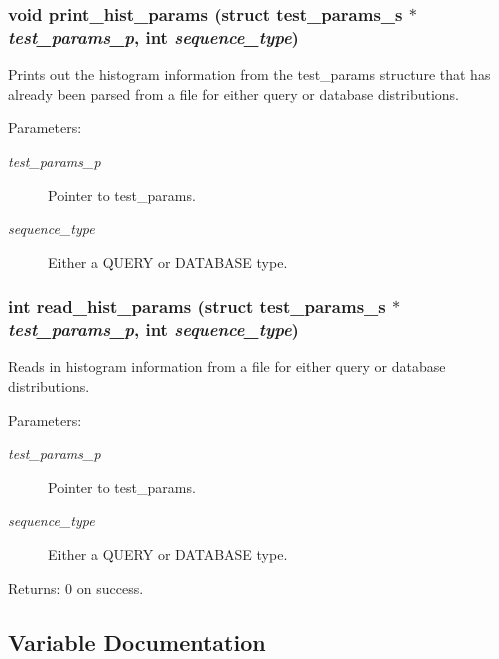 \subsubsection{\setlength{\rightskip}{0pt plus 5cm}void print\_\-hist\_\-params (struct \bf{test\_\-params\_\-s} $\ast$ {\em test\_\-params\_\-p}, int {\em sequence\_\-type})}\label{hist__params_8c_13fbbe5d74468cabdd99bf1a14929f8a}


Prints out the histogram information from the test\_\-params structure that has already been parsed from a file for either query or database distributions.

\begin{Desc}
\item[Parameters:]
\begin{description}
\item[{\em test\_\-params\_\-p}]Pointer to test\_\-params. \item[{\em sequence\_\-type}]Either a QUERY or DATABASE type. \end{description}
\end{Desc}
\subsubsection{\setlength{\rightskip}{0pt plus 5cm}int read\_\-hist\_\-params (struct \bf{test\_\-params\_\-s} $\ast$ {\em test\_\-params\_\-p}, int {\em sequence\_\-type})}\label{hist__params_8c_eda2c8a6530c1e87795e1a645c88cd38}


Reads in histogram information from a file for either query or database distributions.

\begin{Desc}
\item[Parameters:]
\begin{description}
\item[{\em test\_\-params\_\-p}]Pointer to test\_\-params. \item[{\em sequence\_\-type}]Either a QUERY or DATABASE type. \end{description}
\end{Desc}
\begin{Desc}
\item[Returns:]0 on success. \end{Desc}


\subsection{Variable Documentation}
